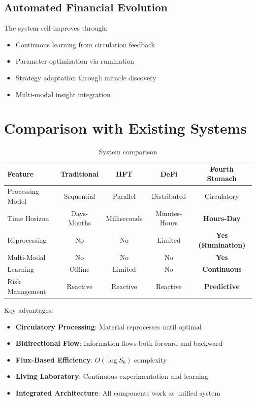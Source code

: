 \documentclass[12pt]{article}
\begin{document}
\subsection{Automated Financial Evolution}

The system self-improves through:
\begin{itemize}
    \item Continuous learning from circulation feedback
    \item Parameter optimization via rumination
    \item Strategy adaptation through miracle discovery
    \item Multi-modal insight integration
\end{itemize}

\section{Comparison with Existing Systems}

\begin{table}[h]
\centering
\begin{tabular}{|l|c|c|c|c|}
\hline
Feature & Traditional & HFT & DeFi & Fourth Stomach \\
\hline
Processing Model & Sequential & Parallel & Distributed & Circulatory \\
Time Horizon & Days-Months & Milliseconds & Minutes-Hours & \textbf{Hours-Day} \\
Reprocessing & No & No & Limited & \textbf{Yes (Rumination)} \\
Multi-Modal & No & No & No & \textbf{Yes} \\
Learning & Offline & Limited & No & \textbf{Continuous} \\
Risk Management & Reactive & Reactive & Reactive & \textbf{Predictive} \\
\hline
\end{tabular}
\caption{System comparison}
\end{table}

Key advantages:
\begin{itemize}
    \item \textbf{Circulatory Processing}: Material reprocesses until optimal
    \item \textbf{Bidirectional Flow}: Information flows both forward and backward
    \item \textbf{Flux-Based Efficiency}: $O(\log S_0)$ complexity
    \item \textbf{Living Laboratory}: Continuous experimentation and learning
    \item \textbf{Integrated Architecture}: All components work as unified system
\end{itemize}
\end{document}

